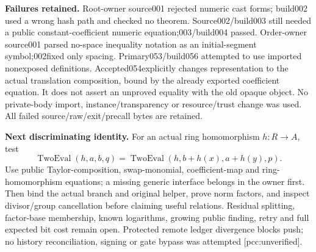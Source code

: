 \documentclass[10pt]{article}
\begin{document}
\textbf{Failures retained.}
Root-owner source001 rejected numeric cast forms; build002 used a
wrong hash path and checked no theorem. Source002/build003 still
needed a public constant-coefficient numeric equation;003/build004
passed. Order-owner source001 parsed no-space inequality notation as
an initial-segment symbol;002fixed only spacing.
Primary053/build056 attempted to use imported nonexposed definitions.
Accepted054explicitly changes representation to the actual translation
composition, bound by the already exported coefficient equation.
It does not assert an unproved equality with the old opaque object.
No private-body import, instance/transparency or resource/trust
change was used. All failed source/raw/exit/precall bytes are retained.

\textbf{Next discriminating identity.}
For an actual ring homomorphism $h:R\to A$, test
\[
 \operatorname{TwoEval}(h,a,b,q)=
 \operatorname{TwoEval}(h,b+h(x),a+h(y),p).
\]
Use public Taylor-composition, swap-monomial, coefficient-map and
ring-homomorphism equations; a missing generic interface belongs in
the owner first. Then bind the actual branch and original helper,
prove norm factors, and inspect divisor/group cancellation before
claiming useful relations. Residual splitting, factor-base membership,
known logarithms, growing public finding, retry and full expected bit
cost remain open. Protected remote ledger divergence blocks push;
no history reconciliation, signing or gate bypass was attempted [pcc:unverified].
\end{document}
